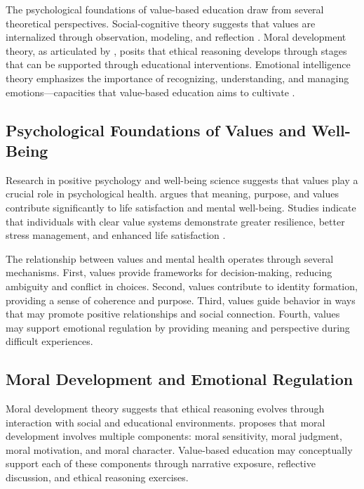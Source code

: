 \documentclass[12pt,a4paper,twocolumn]{article}
\begin{document}
The psychological foundations of value-based education draw from several theoretical perspectives. Social-cognitive theory suggests that values are internalized through observation, modeling, and reflection \citep{Bandura1986}. Moral development theory, as articulated by \citet{Kohlberg1981}, posits that ethical reasoning develops through stages that can be supported through educational interventions. Emotional intelligence theory emphasizes the importance of recognizing, understanding, and managing emotions—capacities that value-based education aims to cultivate \citep{Goleman1995}.

\subsection{Psychological Foundations of Values and Well-Being}

Research in positive psychology and well-being science suggests that values play a crucial role in psychological health. \citet{Seligman2011} argues that meaning, purpose, and values contribute significantly to life satisfaction and mental well-being. Studies indicate that individuals with clear value systems demonstrate greater resilience, better stress management, and enhanced life satisfaction \citep{Desai2020}.

The relationship between values and mental health operates through several mechanisms. First, values provide frameworks for decision-making, reducing ambiguity and conflict in choices. Second, values contribute to identity formation, providing a sense of coherence and purpose. Third, values guide behavior in ways that may promote positive relationships and social connection. Fourth, values may support emotional regulation by providing meaning and perspective during difficult experiences.

\subsection{Moral Development and Emotional Regulation}

Moral development theory suggests that ethical reasoning evolves through interaction with social and educational environments. \citet{Narvaez2006} proposes that moral development involves multiple components: moral sensitivity, moral judgment, moral motivation, and moral character. Value-based education may conceptually support each of these components through narrative exposure, reflective discussion, and ethical reasoning exercises.
\end{document}
